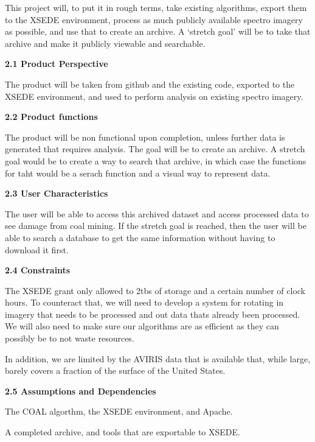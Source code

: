 \documentclass[a4paper,12pt]{article}
\begin{document}
\noindent This project will, to put it in rough terms, take existing algorithms, export them to the XSEDE environment, process as much publicly available spectro imagery as possible, and use that to create an archive. A ‘stretch goal’ will be to take that archive and make it publicly viewable and searchable. \par


\par


\noindent \textbf{2.1 Product Perspective}\par


\noindent The product will be taken from github and the existing code, exported to the XSEDE environment, and used to perform analysis on existing spectro imagery. \par


\noindent \textbf{2.2 Product functions}\par


\noindent The product will be non functional upon completion, unless further data is generated that requires analysis. The goal will be to create an archive. A stretch goal would be to create a way to search that archive, in which case the functions for taht would be a serach function and a visual way to represent data. \par


\noindent \textbf{2.3 User Characteristics}\par


\noindent The user will be able to access this archived dataset and access processed data to see damage from coal mining. If the stretch goal is reached, then the user will be able to search a database to get the same information without having to download it first. \par


\noindent \textbf{2.4 Constraints}\par


\noindent The XSEDE grant only allowed to 2tbs of storage and a certain number of clock hours. To counteract that, we will need to develop a system for rotating in imagery that needs to be processed and out data thats already been processed. We will also need to make sure our algorithms are as efficient as they can possibly be to not waste resources.\par


\noindent In addition, we are limited by the AVIRIS data that is available that, while large, barely covers a fraction of the surface of the United States. \par


\noindent \textbf{2.5 Assumptions and Dependencies}\par


\noindent The COAL algorthm, the XSEDE environment, and Apache.\par


\par


\noindent A completed archive, and tools that are exportable to XSEDE.\par
\end{document}
